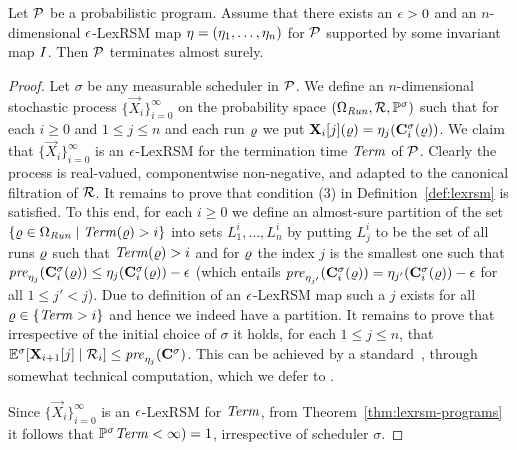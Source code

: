 \begin{theorem}
\label{thm:lexrsm-programs}
Let $\mathcal{P}$ be a probabilistic program. Assume that there exists an $\epsilon>0$ 
and an $n$-dimensional $\epsilon$-LexRSM map $\mathbf{\eta}=(\eta_1,\dots,\eta_n)$ for 
$\mathcal{P}$ supported 
by some 
invariant map $I$. 
Then $\mathcal{P}$ terminates almost surely.
\end{theorem}
\begin{proof}
Let $\sigma$ be any measurable scheduler in $\mathcal{P}$.
We define an $n$-dimensional stochastic process 
$\{\vec{X}_{i}\}_{i=0}^{\infty} $ on the probability space 
$(\Omega_{\mathit{Run}},\mathcal{R},\mathbb{P}^{\sigma})$ such 
that for each 
$i\geq 0$ and $1\leq j 
\leq n$ and each run $\varrho$ we put $\mathbf{X}_{i}[j](\varrho) = 
\eta_j(\mathbf{C}^{\sigma}_{i}(\varrho))$. We claim that $\{\vec{X}_{i}\}_{i=0}^{\infty}$ 
is an $\epsilon$-LexRSM for the termination time $\mathit{Term}$ of $\mathcal{P}$. Clearly 
the process is real-valued, componentwise non-negative, and adapted to the 
canonical filtration of $\mathcal{R}$. It remains to prove that condition (3) in 
Definition~\ref{def:lexrsm} is satisfied. To this end, for each $i\geq 0$ we 
define an almost-sure partition of the set $\{\varrho\in \Omega_{\mathit{Run}}\mid 
\mathit{Term}(\varrho) >i\}$ into sets $L^{i}_1,\dots,L^{i}_n$ by putting $L^i_j$ to be 
the set of all runs $\varrho$ such that $\mathit{Term}(\varrho)>i$ and for $\varrho$ the index 
$j$ is the smallest one such that $\mathit{pre}_{\eta_j}(\mathbf{C}^{\sigma}_{i}(\varrho)) \leq 
\eta_j(\mathbf{C}^{\sigma}_{i}(\varrho))-\epsilon$ (which entails 
$\mathit{pre}_{\eta_{j'}}(\mathbf{C}^{\sigma}_{i}(\varrho)) =
\eta_{j'}(\mathbf{C}^{\sigma}_{i}(\varrho))-\epsilon$ for all $1\leq j'< j$). Due to 
definition of an $\epsilon$-LexRSM map such a $j$ exists for all 
$\varrho\in\{\mathit{Term}>i\}$ and hence we indeed have a partition. It remains to prove 
that irrespective of the initial choice of $\sigma$ it holds, for each $1\leq j 
\leq n$, that $\mathbb{E}^\sigma[\mathbf{X}_{i+1}[j]\mid 
\mathcal{R}_i]\leq\mathit{pre}_{\eta_{j}}(\mathbf{C}^{\sigma}_{}) $. This can be achieved by a 
standard~\cite{xxx}, through somewhat technical computation, which we defer to 
\AppendixMaterial.

Since  $\{\vec{X}_{i}\}_{i=0}^{\infty}$ 
is an $\epsilon$-LexRSM for $\mathit{Term}$, from Theorem~\ref{thm:lexrsm-programs} it 
follows that $\mathbb{P}^{\sigma}\mathit{Term} <\infty) =1$, irrespective of scheduler 
$\sigma$.
\end{proof} 



